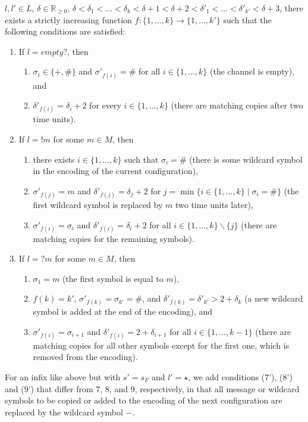 \documentclass{CSML}
\theoremstyle{plain}\newtheorem{theorem}[thm]{Theorem}
\theoremstyle{plain}\newtheorem{corollary}[thm]{Corollary}
\theoremstyle{plain}\newtheorem{example}[thm]{Example}
\theoremstyle{plain}\newtheorem{lemma}[thm]{Lemma}
\theoremstyle{plain}\newtheorem{remark}[thm]{Remark}
\newcommand{\RP}{\mathbb{R}_{\geq 0}}
\begin{document}
$l,l'\in L$,
$\delta\in\RP$,
$\delta<\delta_1<\dots<\delta_k<\delta+1<\delta+2<\delta'_1<\dots<\delta'_{k'}<\delta+3$,
there exists a strictly increasing function $f:\{1,\dots,k\}\to\{1,\dots,k'\}$ such that the following conditions are satisfied:
\begin{enumerate}
	\addtocounter{enumi}{6} 
\item If $l=empty?$,
	then 
	\begin{enumerate}
	\item $\sigma_i\in\{+,\#\}$ and $\sigma'_{f(i)}=\#$ for all $i\in\{1,\dots,k\}$ (the channel is empty), and
	\item $\delta'_{f(i)}=\delta_i+2$ for every $i\in\{1,\dots,k\}$ (there are matching copies after two time units).
	\end{enumerate}	
\item If $l=!m$ for some $m\in M$, then
	\begin{enumerate}
	\item there exists $i\in\{1,\dots,k\}$ such that $\sigma_i=\#$ (there is some wildcard symbol in the encoding of the current configuration),  
	\item $\sigma'_{f(j)}=m$ and $\delta'_{f(j)}=\delta_j+2$ for $j=\min\{i\in\{1,\dots,k\}\mid \sigma_i=\#\}$ (the first wildcard symbol is replaced by $m$ two time units later), 
	\item $\sigma'_{f(i)}=\sigma_i$ and $\delta'_{f(i)} = \delta_i+2$  for all $i\in\{1,\dots,k\}\backslash\{j\}$ (there are matching copies for the remaining symbols).
	\end{enumerate}
\item If $l=?m$ for some $m\in M$, then 
	\begin{enumerate}
	\item $\sigma_1=m$ (the first symbol is equal to $m$),
	\item $f(k)=k'$, $\sigma'_{f(k)}=\sigma_{k'}=\#$, and 
		$\delta'_{f(k)}=\delta'_{k'}>2+\delta_k$ (a new wildcard symbol is added at the end of the encoding), and
	\item $\sigma'_{f(i)}=\sigma_{i+1}$ and $\delta'_{f(i)}=2+\delta_{i+1}$  for all $i\in\{1,\dots,k-1\}$ (there are matching copies for all other symbols except for the first one, which is removed from the encoding). 
\end{enumerate}		
\end{enumerate}\smallskip

\noindent For an infix like above but with $s'=s_F$ and $l'=\star$, we add conditions (7'), (8') and (9') that   differ from 7, 8, and 9, respectively, in that all message or wildcard symbols to be copied or added to the encoding of the next configuration are replaced by the wildcard symbol $-$.
\end{document}
